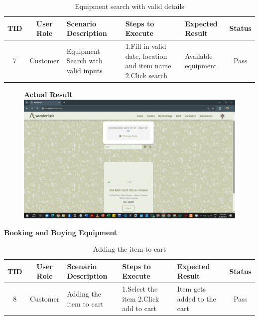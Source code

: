 \begin{table}[ht]
\centering
\begin{tabularx}{\textwidth}{|c|c|X|X|X|c|}
\hline
\textbf{TID} & \textbf{User Role} & \textbf{Scenario Description} & \textbf{Steps to Execute} & \textbf{Expected Result} & \textbf{Status} \\ \hline
7 & Customer & Equipment Search with valid inputs & 1.Fill in valid date, location and item name \newline 2.Click search & Available equipment & Pass \\ \hline
\end{tabularx}
\caption{Equipment search with valid details}
\end{table}

\begin{figure}[h!]
    \centering
    \textbf{Actual Result}
    \includegraphics[width=1\textwidth]{Images/Test Cases/7. valid rent.png}
\end{figure}
\clearpage


\textbf{Booking and Buying Equipment}\\
\begin{table}[ht]
\centering
\begin{tabularx}{\textwidth}{|c|c|X|X|X|c|}
\hline
\textbf{TID} & \textbf{User Role} & \textbf{Scenario Description} & \textbf{Steps to Execute} & \textbf{Expected Result} & \textbf{Status} \\ \hline
8 & Customer & Adding the item to cart & 1.Select the item \newline2.Click add to cart & Item gets added to the cart & Pass \\ \hline
\end{tabularx}
\caption{Adding the item to cart}
\end{table}

